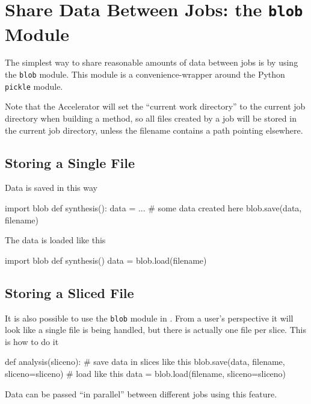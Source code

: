 
\section{Share Data Between Jobs:  the \texttt{blob} Module}

The simplest way to share reasonable amounts of data between jobs is
by using the \texttt{blob} module.  This module is a
convenience-wrapper around the Python \texttt{pickle} module.

Note that the Accelerator will set the ``current work directory'' to
the current job directory when building a method, so all files created
by a job will be stored in the current job directory, unless the
filename contains a path pointing elsewhere.

\subsection*{Storing a  Single File}
Data is saved in this way
\begin{python}
import blob
def synthesis():
    data = ...  # some data created here
    blob.save(data, filename)
\end{python}
The data is loaded like this
\begin{python}
import blob
def synthesis()
    data = blob.load(filename)
\end{python}



\subsection{Storing a Sliced File}
It is also possible to use the \texttt{blob} module in \analysis.
From a user's perspective it will look like a single file is being
handled, but there is actually one file per slice.  This is how to do
it
\begin{python}
def analysis(sliceno):
    # save data in slices like this
    blob.save(data, filename, sliceno=sliceno)
    # load like this
    data = blob.load(filename, sliceno=sliceno)
\end{python}

Data can be passed ``in parallel'' between different jobs using this
feature.



